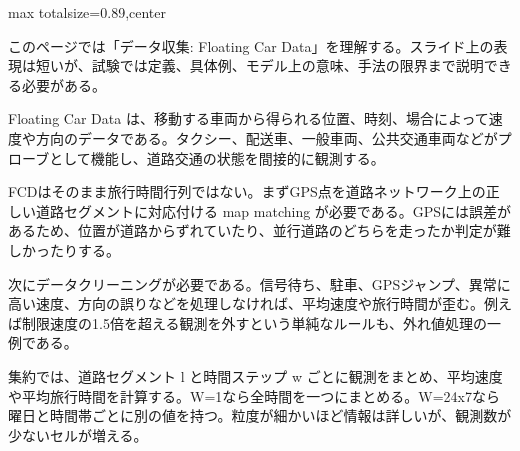 \begin{minipage}[t]{0.58\textwidth}
\begin{adjustbox}{max totalsize={\textwidth}{0.89\textheight},center}
\begin{minipage}{\textwidth}\scriptsize
{}このページでは「データ収集: Floating Car Data」を理解する。スライド上の表現は短いが、試験では定義、具体例、モデル上の意味、手法の限界まで説明できる必要がある。\par
Floating Car Data は、移動する車両から得られる位置、時刻、場合によって速度や方向のデータである。タクシー、配送車、一般車両、公共交通車両などがプローブとして機能し、道路交通の状態を間接的に観測する。\par
FCDはそのまま旅行時間行列ではない。まずGPS点を道路ネットワーク上の正しい道路セグメントに対応付ける map matching が必要である。GPSには誤差があるため、位置が道路からずれていたり、並行道路のどちらを走ったか判定が難しかったりする。\par
次にデータクリーニングが必要である。信号待ち、駐車、GPSジャンプ、異常に高い速度、方向の誤りなどを処理しなければ、平均速度や旅行時間が歪む。例えば制限速度の1.5倍を超える観測を外すという単純なルールも、外れ値処理の一例である。\par
集約では、道路セグメント l と時間ステップ w ごとに観測をまとめ、平均速度や平均旅行時間を計算する。W=1なら全時間を一つにまとめる。W=24x7なら曜日と時間帯ごとに別の値を持つ。粒度が細かいほど情報は詳しいが、観測数が少ないセルが増える。\par

\end{minipage}
\end{adjustbox}
\end{minipage}
